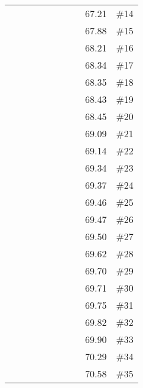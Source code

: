 \begin{longtable}{|c|c|c|c|c|c|c|c|c|c|}
 \x    & \x    & \x    &       & \x    &       &       & \x\m  & 67.21 & \#14 \\
 \x    & \x    & \x    & \x    & \x    & \x    &       &       & 67.88 & \#15 \\
 \x    & \x    & \x    &       & \x    & \x    &       & \x    & 68.21 & \#16 \\
 \x    & \x    & \x    &       & \x\m  & \x\m  &       &       & 68.34 & \#17 \\
 \x    & \x    & \x    &       & \x\m  &       &       & \x\m  & 68.35 & \#18 \\
 \x    & \x    & \x    & \x    & \x    & \x    & \x    &       & 68.43 & \#19 \\
 \x    & \x    & \x    & \x    & \x    &       &       & \x\m  & 68.45 & \#20 \\
 \x    & \x    & \x    &       & \x    &       &       &       & 69.09 & \#21 \\
 \x    & \x    & \x    & \x    &       & \x    &       &       & 69.14 & \#22 \\
 \x    & \x    & \x    &       & \x    &       & \x    &       & 69.34 & \#23 \\
 \x    & \x    & \x    & \x    & \x\m  & \x    & \x    &       & 69.37 & \#24 \\
 \x    & \x    & \x    & \x    & \x\m  &       &       & \x\m  & 69.46 & \#25 \\
 \x    & \x    & \x    & \x    & \x    & \x\m  & \x    &       & 69.47 & \#26 \\
 \x    & \x    & \x    & \x    &       & \x\m  &       &       & 69.50 & \#27 \\
 \x    & \x    & \x    & \x    & \x    &       &       &       & 69.62 & \#28 \\
 \x    & \x    & \x    & \x    &       & \x    & \x    &       & 69.70 & \#29 \\
 \x    & \x    & \x    & \x    & \x\m  &       &       & \x    & 69.71 & \#30 \\
 \x    & \x    & \x    &       & \x    &       &       & \x    & 69.75 & \#31 \\
 \x    & \x    & \x    & \x    & \x    &       & \x    &       & 69.82 & \#32 \\
 \x    & \x    & \x    &       &       &       &       &       & 69.90 & \#33 \\
 \x    & \x    & \x    & \x    &       & \x\m  & \x    &       & 70.29 & \#34 \\
 \x    & \x    & \x    &       & \x    & \x    & \x    &       & 70.58 & \#35 \\

\end{longtable}
